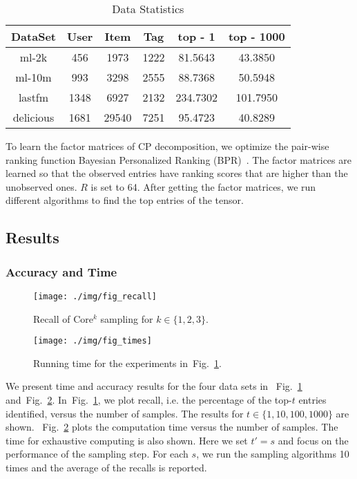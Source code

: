 \documentclass[10pt,journal,compsoc]{IEEEtran}
\newcommand{\Fig}[1]{Fig.~\ref{fig:#1}}
\begin{document}
\begin{table}[!ht]
	\centering
	\begin{tabular}{|c|c|c|c|c|c|}
		\hline
		 DataSet  & User & Item  & Tag  &  top - 1   & top - 1000 \\ \hline
		  ml-2k   & 456  & 1973  & 1222 & 81.5643  &  43.3850   \\
		 ml-10m   & 993  & 3298  & 2555 & 88.7368  &  50.5948   \\
		 lastfm   & 1348 & 6927  & 2132 & 234.7302 &  101.7950  \\
		delicious & 1681 & 29540 & 7251 & 95.4723  &  40.8289   \\ \hline
	\end{tabular}
	\caption{Data Statistics}
	\label{table:Data}
\end{table}
To learn the factor matrices of CP decomposition,
we optimize the pair-wise
ranking function Bayesian Personalized Ranking (BPR)~\cite{Rendle_BPR,Rendle_RTF}.
The factor matrices are learned so that the observed entries have ranking scores that are higher than the unobserved ones. 
$R$ is set to 64. 
After getting the factor matrices, 
we run different algorithms to find the top entries of the tensor.

\subsection{Results}
\subsubsection{Accuracy and Time}

\begin{figure}[!]
	\centering
	\texttt{[image: ./img/fig\_recall]}\\
	\caption{Recall of Core$^k$ sampling for $k\in\{1,2,3\}$.}
	\label{fig:recall}
\end{figure}
\begin{figure}[!]
	\centering
	\texttt{[image: ./img/fig\_times]}\\
	\caption{Running time for the experiments in~\Fig{recall}.}
	\label{fig:time}
\end{figure}
We present time and accuracy results for the four data sets in
~\Fig{recall} and~\Fig{time}.
In~\Fig{recall}, we plot recall, i.e. the percentage of the top-$t$ entries identified,
versus the number of samples.
The results for $t\in\{1,10,100,1000\}$ are shown.
~\Fig{time} plots the computation time versus the number of samples.
The time for exhaustive computing is also shown.
Here we set $t'=s$ and focus on the performance of the sampling step.
For each $s$, we run the sampling algorithms 10 times and the average of the recalls is reported.
\end{document}
